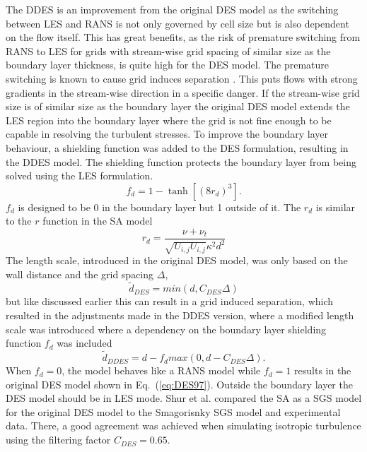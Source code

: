 The DDES is an improvement from the original DES model as the switching between LES and RANS is not only governed by cell size but is also dependent on the flow itself. This has great benefits, as the risk of premature switching from RANS to LES for grids with stream-wise grid spacing of similar size as the boundary layer thickness, is quite high for the DES model. The premature switching is known to cause grid induces separation \cite{DDES}. This puts flows with strong gradients in the stream-wise direction in a specific danger. If the stream-wise grid size is of similar size as the boundary layer the original DES model extends the LES region into the boundary layer where the grid is not fine enough to be capable in resolving the turbulent stresses. To improve the boundary layer behaviour, a shielding function was added to the DES formulation, resulting in the DDES model. The shielding function protects the boundary layer from being solved using the LES formulation.
\begin{equation}
  f_d = 1-\tanh\left[(8r_d)^3\right].
  \label{eq:fd}
\end{equation}
$f_d$ is designed to be 0 in the boundary layer but 1 outside of it. The $r_d$ is similar to the $r$ function in the SA model
\begin{equation}
  r_d = \frac{\nu+\nu_t}{\sqrt{U_{i,j}U_{i,j}}\kappa^2 d^2}
  \label{eq:rd}
\end{equation}
The length scale, introduced in the original DES model, was only based on the wall distance and the grid spacing $\Delta$,
\begin{equation}
  \tilde{d}_{DES}=min(d,C_{DES}\Delta)
  \label{eq:DES97}
\end{equation}
but like discussed earlier this can result in a grid induced separation, which resulted in the adjustments made in the DDES version, where a modified length scale was introduced where a dependency on the boundary layer shielding function $f_d$ was included
\begin{equation}
  \tilde{d}_{DDES} = d-f_dmax(0,d-C_{DES}\Delta).
  \label{eq:DDES}
\end{equation}
When $f_d=0$, the model behaves like a RANS model while $f_d=1$ results in the original DES model shown in Eq.~(\ref{eq:DES97}). Outside the boundary layer the DES model should be in LES mode. Shur et al. \cite{DES99} compared the SA as a SGS model for the original DES model to the Smagorisnky SGS model and experimental data. There, a good agreement was achieved when simulating isotropic turbulence using the filtering factor $C_{DES}=0.65$.

